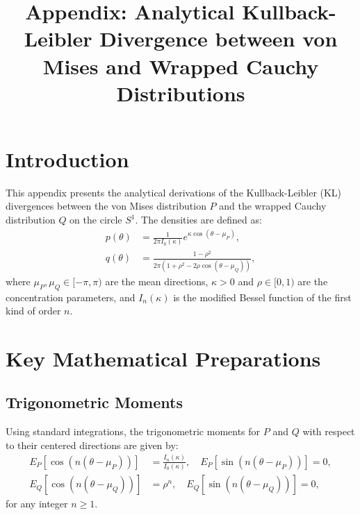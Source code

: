 \documentclass[11pt,a4paper]{article}
\title{Appendix: Analytical Kullback-Leibler Divergence between von Mises and Wrapped Cauchy Distributions}
\author{}
\date{}
\begin{document}
\maketitle

\section{Introduction}
This appendix presents the analytical derivations of the Kullback-Leibler (KL) divergences between the von Mises distribution $P$ and the wrapped Cauchy distribution $Q$ on the circle $S^1$. The densities are defined as:
\begin{align}
p(\theta) &= \frac{1}{2\pi I_0(\kappa)} e^{\kappa \cos(\theta - \mu_P)}, \\
q(\theta) &= \frac{1 - \rho^2}{2\pi (1 + \rho^2 - 2\rho \cos(\theta - \mu_Q))},
\end{align}
where $\mu_P, \mu_Q \in [-\pi, \pi)$ are the mean directions, $\kappa > 0$ and $\rho \in [0, 1)$ are the concentration parameters, and $I_n(\kappa)$ is the modified Bessel function of the first kind of order $n$.

\section{Key Mathematical Preparations}

\subsection{Trigonometric Moments}
Using standard integrations, the trigonometric moments for $P$ and $Q$ with respect to their centered directions are given by:
\begin{align}
E_P[\cos(n(\theta - \mu_P))] &= \frac{I_n(\kappa)}{I_0(\kappa)}, \quad E_P[\sin(n(\theta - \mu_P))] = 0, \\
E_Q[\cos(n(\theta - \mu_Q))] &= \rho^n, \quad E_Q[\sin(n(\theta - \mu_Q))] = 0,
\end{align}
for any integer $n \ge 1$.
\end{document}
